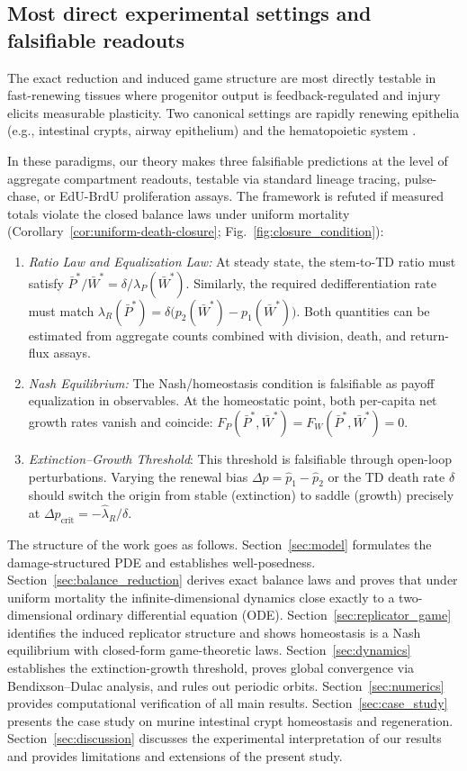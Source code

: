 \documentclass[pdflatex,sn-mathphys-ay]{sn-jnl}
\theoremstyle{thmstyleone}
\theoremstyle{definition}
\theoremstyle{remark}
\begin{document}
\subsection{Most direct experimental settings and falsifiable readouts}
The exact reduction and induced game structure are most directly testable in fast-renewing tissues where progenitor output is feedback-regulated and injury elicits measurable plasticity. Two canonical settings are rapidly renewing epithelia (e.g., intestinal crypts, airway epithelium) \citep{gall_homeostasis_2023} and the hematopoietic system \citep{zhao_regulation_2015,safina_new_2024}.

In these paradigms, our theory makes three falsifiable predictions at the level of aggregate compartment readouts, testable via standard lineage tracing, pulse-chase, or EdU-BrdU proliferation assays. The framework is refuted if measured totals violate the closed balance laws under uniform mortality (Corollary~\ref{cor:uniform-death-closure}; Fig.~\ref{fig:closure_condition}):
\begin{enumerate}[label=(\roman*)]
\item \textit{Ratio Law and Equalization Law:} At steady state, the stem-to-TD ratio must satisfy $\bar P^*/\bar W^*=\delta/\lambda_P(\bar W^*)$. Similarly, the required dedifferentiation rate must match $\lambda_R(\bar P^*)=\delta\big(p_2(\bar W^*)-p_1(\bar W^*)\big)$. Both quantities can be estimated from aggregate counts combined with division, death, and return-flux assays.
\item \textit{Nash Equilibrium:} The Nash/homeostasis condition is falsifiable as payoff equalization in observables. At the homeostatic point, both per-capita net growth rates vanish and coincide: $F_P(\bar P^*,\bar W^*)=F_W(\bar P^*,\bar W^*)=0$.
\item \textit{Extinction--Growth Threshold}: This threshold is falsifiable through open-loop perturbations. Varying the renewal bias $\Delta p=\hat p_1-\hat p_2$ or the TD death rate $\delta$ should switch the origin from stable (extinction) to saddle (growth) precisely at $\Delta p_{\mathrm{crit}}=-\hat\lambda_R/\delta$.
\end{enumerate} 

The structure of the work goes as follows. Section~\ref{sec:model} formulates the damage-structured PDE and establishes well-posedness. Section~\ref{sec:balance_reduction} derives exact balance laws and proves that under uniform mortality the infinite-dimensional dynamics close exactly to a two-dimensional ordinary differential equation (ODE). Section~\ref{sec:replicator_game} identifies the induced replicator structure and shows homeostasis is a Nash equilibrium with closed-form game-theoretic laws. Section~\ref{sec:dynamics} establishes the extinction-growth threshold, proves global convergence via Bendixson--Dulac analysis, and rules out periodic orbits. Section~\ref{sec:numerics} provides computational verification of all main results. Section~\ref{sec:case_study} presents the case study on murine intestinal crypt homeostasis and regeneration. Section~\ref{sec:discussion} discusses the experimental interpretation of our results and provides limitations and extensions of the present study.
\end{document}
